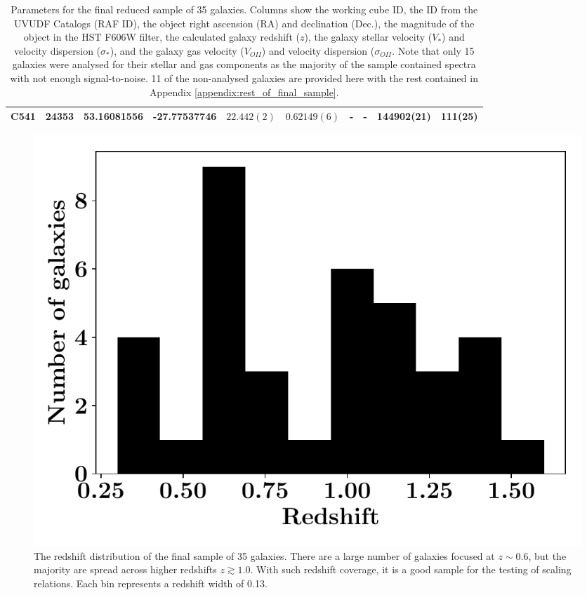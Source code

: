 \documentclass[12pt, twocolumn, nofootinbib]{revtex4-1}    %
\begin{document}
\begin{table}
\begin{tabular}{c@{\hskip 10pt}c@{\hskip 10pt}c@{\hskip 10pt}c@{\hskip 10pt}c@{\hskip 10pt}c@{\hskip 10pt}c@{\hskip 10pt}c@{\hskip 10pt}c@{\hskip 10pt}c}
C541 & 24353 & 53.16081556 & -27.77537746 & $22.442(2)$ & $0.62149(6)$ & - & - & 144902(21) & 111(25) \\ 
 \hline
\end{tabular}
\caption{Parameters for the final reduced sample of 35 galaxies. Columns show the working cube ID, the ID from the UVUDF Catalogs \citep{2015AJ....150...31R} (RAF ID), the object right ascension (RA) and declination (Dec.), the magnitude of the object in the HST F606W filter, the calculated galaxy redshift ($z$), the galaxy stellar velocity ($V_*$) and velocity dispersion ($\sigma_*$), and the galaxy gas velocity ($V_{OII}$) and velocity dispersion ($\sigma_{OII}$. Note that only 15 galaxies were analysed for their stellar and gas components as the majority of the sample contained spectra with not enough signal-to-noise. 11 of the non-analysed galaxies are provided here with the rest contained in Appendix \ref{appendix:rest_of_final_sample}.}
\label{table:final_sample}
\end{table}

\begin{figure}
\includegraphics[width=\linewidth]{data/redshift_distribution_oii_emitters.pdf}
\caption{The redshift distribution of the final sample of 35 galaxies. There are a large number of galaxies focused at $z\sim0.6$, but the majority are spread across higher redshifts $z\gtrsim1.0$. With such redshift coverage, it is a good sample for the testing of scaling relations. Each bin represents a redshift width of 0.13.}
\label{fig:redshift_dist}
\end{figure}
\end{document}
